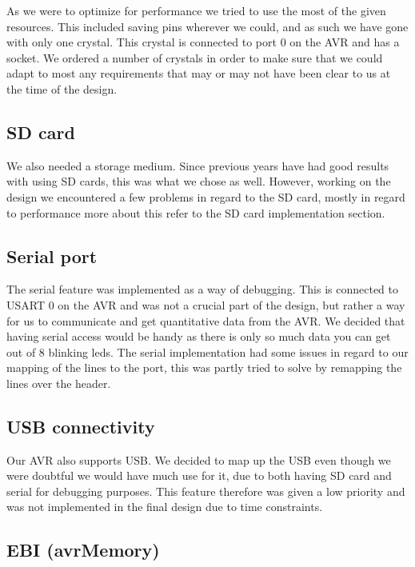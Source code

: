 As we were to optimize for performance we tried to use the most of the given resources. This included saving pins wherever we could, and as such we have gone with only one crystal. This crystal is connected to port 0 on the AVR and has a socket. We ordered a number of crystals in order to make sure that we could adapt to most any requirements that may or may not have been clear to us at the time of the design.

\subsection{\ac{SD} card}

We also needed a storage medium. Since previous years have had good results with
using \ac{SD} cards, this was what we chose as well. However, working on the
design we encountered a few problems in regard to the \ac{SD} card, mostly in
regard to performance more about this refer to the \ac{SD} card implementation
section. 

\subsection{Serial port}

The serial feature was implemented as a way of debugging. This is connected to
\ac{USART} 0 on the AVR and was not a crucial part of the design, but rather a way for us to communicate and get quantitative data from the AVR. We decided that having serial access would be handy as there is only so much data you can get out of 8 blinking leds. The serial implementation had some issues in regard to our mapping of the lines to the port, this was partly tried to solve by remapping the lines over the header.

\subsection{\ac{USB} connectivity}

Our AVR also supports \ac{USB}. We decided to map up the \ac{USB} even though we were doubtful we would have much use for it, due to both having \ac{SD} card and serial for debugging purposes. This feature therefore was given a low priority and was not implemented in the final design due to time constraints.
 
\subsection{\ac{EBI} (avrMemory)}

